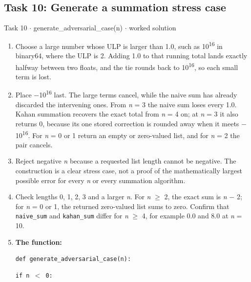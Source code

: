 \documentclass[11pt]{article}
\begin{document}
\begin{keepsection}
\end{keepsection}
\begin{keepsection}\subsection{Task 10: Generate a summation stress case}

\begin{workedbox}{Task 10 \ensuremath{\cdot} generate\_adversarial\_case(n) \ensuremath{\cdot} worked solution}
\begin{enumerate}
\item Choose a large number whose ULP is larger than 1.0, such as 10\textsuperscript{16} in binary64, where the ULP is 2. Adding 1.0 to that running total lands exactly halfway between two floats, and the tie rounds back to 10\textsuperscript{16}, so each small term is lost.
\item Place \ensuremath{-}10\textsuperscript{16} last. The large terms cancel, while the naive sum has already discarded the intervening ones. From \textit{n} = 3 the naive sum loses every 1.0. Kahan summation recovers the exact total from \textit{n} = 4 on; at \textit{n} = 3 it also returns 0, because its one stored correction is rounded away when it meets \ensuremath{-}10\textsuperscript{16}. For \textit{n} = 0 or 1 return an empty or zero-valued list, and for \textit{n} = 2 the pair cancels.
\item Reject negative \textit{n} because a requested list length cannot be negative. The construction is a clear stress case, not a proof of the mathematically largest possible error for every \textit{n} or every summation algorithm.
\item Check lengths 0, 1, 2, 3 and a larger \textit{n}. For \textit{n} \ensuremath{\geq} 2, the exact sum is \textit{n} \ensuremath{-} 2; for \textit{n} = 0 or 1, the returned zero-valued list sums to zero. Confirm that \texttt{naive\_sum} and \texttt{kahan\_sum} differ for \textit{n} \ensuremath{\geq} 4, for example 0.0 and 8.0 at \textit{n} = 10.
\item {}
\textbf{The function:}
\begin{tcolorbox}[colback=Paperblue,colframe=Paperblue,boxrule=0pt,arc=0pt,left=7pt,right=7pt,top=5pt,bottom=5pt]\small\sloppy
\noindent\hspace*{0em}\texttt{def generate\_adversarial\_case(n):}\par
\noindent\hspace*{1em}\texttt{if n \ensuremath{<} 0:}\par

\end{tcolorbox}
\end{enumerate}
\end{workedbox}
\end{keepsection}
\end{document}
